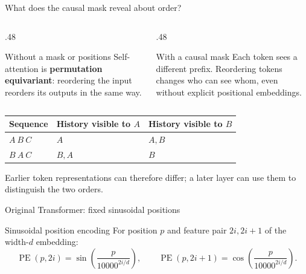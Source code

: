 \documentclass[handout]{beamer}
\begin{document}
\begin{frame}{What does the causal mask reveal about order?}
  \begin{columns}[t]
    \begin{column}{.48\linewidth}
      \begin{block}{Without a mask or positions}
        Self-attention is \textbf{permutation equivariant}: reordering the input reorders its outputs in the same way.
      \end{block}
    \end{column}
    \begin{column}{.48\linewidth}
      \begin{block}{With a causal mask}
        Each token sees a different prefix. Reordering tokens changes who can see whom, even without explicit positional embeddings.
      \end{block}
    \end{column}
  \end{columns}
  \vfill
  \centering\small
  \begin{tabular}{lll}
    \toprule
    Sequence & History visible to $A$ & History visible to $B$ \\
    \midrule
    $A\ B\ C$ & $A$ & $A, B$ \\
    $B\ A\ C$ & $B, A$ & $B$ \\
    \bottomrule
  \end{tabular}
  \vfill
  \footnotesize Earlier token representations can therefore differ; a later layer can use them to distinguish the two orders.
\end{frame}

\begin{frame}{Original Transformer: fixed sinusoidal positions}
  \begin{block}{Sinusoidal position encoding}
    \footnotesize For position $p$ and feature pair $2i,2i+1$ of the width-$d$ embedding:
    \[
      \operatorname{PE}(p,2i)=\sin\!\left(\frac{p}{10000^{2i/d}}\right),\qquad
      \operatorname{PE}(p,2i+1)=\cos\!\left(\frac{p}{10000^{2i/d}}\right).
    \]
  \end{block}
\end{frame}
\end{document}

